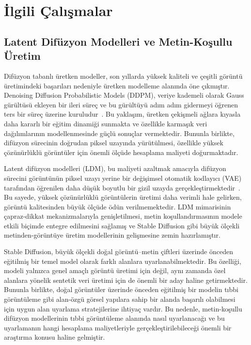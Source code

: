 \documentclass[11pt]{article}
\begin{document}
\section{İlgili Çalışmalar}
\label{sec:related}

\subsection{Latent Difüzyon Modelleri ve Metin-Koşullu Üretim}

Difüzyon tabanlı üretken modeller, son yıllarda yüksek kaliteli ve çeşitli
görüntü üretimindeki başarıları nedeniyle üretken modelleme alanında öne
çıkmıştır. Denoising Diffusion Probabilistic Models (DDPM), veriye kademeli
olarak Gauss gürültüsü ekleyen bir ileri süreç ve bu gürültüyü adım adım
gidermeyi öğrenen ters bir süreç üzerine kuruludur~\cite{ddpm}. Bu yaklaşım,
üretken çekişmeli ağlara kıyasla daha kararlı bir eğitim dinamiği sunmakta ve
özellikle karmaşık veri dağılımlarının modellenmesinde güçlü sonuçlar
vermektedir. Bununla birlikte, difüzyon sürecinin doğrudan piksel uzayında
yürütülmesi, özellikle yüksek çözünürlüklü görüntüler için önemli ölçüde
hesaplama maliyeti doğurmaktadır.

Latent difüzyon modelleri (LDM), bu maliyeti azaltmak amacıyla difüzyon
sürecini görüntünün piksel uzayı yerine bir değişimsel otomatik kodlayıcı
(VAE) tarafından öğrenilen daha düşük boyutlu bir gizil uzayda
gerçekleştirmektedir~\cite{ldm}. Bu sayede, yüksek çözünürlüklü görüntülerin
üretimi daha verimli hale gelirken, görüntü kalitesinden büyük ölçüde ödün
verilmemektedir. LDM mimarisinin çapraz-dikkat mekanizmalarıyla
genişletilmesi, metin koşullandırmasının modele etkili biçimde entegre
edilmesini sağlamış ve Stable Diffusion gibi büyük ölçekli metinden-görüntüye
üretim modellerinin gelişmesine zemin hazırlamıştır.

Stable Diffusion, büyük ölçekli doğal görüntü--metin çiftleri üzerinde önceden
eğitilmiş bir temel model olarak farklı alanlara uyarlanabilmektedir. Bu
özelliği, modeli yalnızca genel amaçlı görüntü üretimi için değil, aynı zamanda
özel alanlara yönelik sentetik veri üretimi için de önemli bir aday haline
getirmektedir. Bununla birlikte, doğal görüntüler üzerinde önceden eğitilmiş
bir modelin tıbbi görüntüleme gibi alan-özgü görsel yapılara sahip bir alanda
başarılı olabilmesi için uygun alan uyarlama stratejilerine ihtiyaç vardır.
Bu nedenle, metin-koşullu difüzyon modellerinin tıbbi görüntüleme alanında
nasıl uyarlanacağı ve bu uyarlamanın hangi hesaplama maliyetleriyle
gerçekleştirilebileceği önemli bir araştırma konusu haline gelmiştir.
\end{document}
